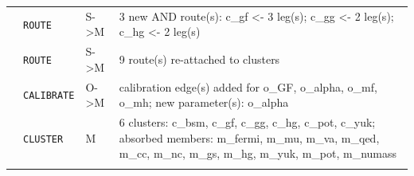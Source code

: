 \begin{longtable}{@{}p{0.6cm}p{1.9cm}p{1.3cm}p{10.5cm}@{}}
\addlinespace[2pt]
12 & \texttt{ROUTE} & S->M & 3 new AND route(s): c\_gf <- 3 leg(s); c\_gg <- 2 leg(s); c\_hg <- 2 leg(s) \\
 & \texttt{ROUTE} & S->M & 9 route(s) re-attached to clusters \\
 & \texttt{CALIBRATE} & O->M & calibration edge(s) added for o\_GF, o\_alpha, o\_mf, o\_mh; new parameter(s): o\_alpha \\
 & \texttt{CLUSTER} & M & 6 clusters: c\_bsm, c\_gf, c\_gg, c\_hg, c\_pot, c\_yuk; absorbed members: m\_fermi, m\_mu, m\_va, m\_qed, m\_cc, m\_nc, m\_gs, m\_hg, m\_yuk, m\_pot, m\_numass \\
\addlinespace[2pt]
\bottomrule\end{longtable}
